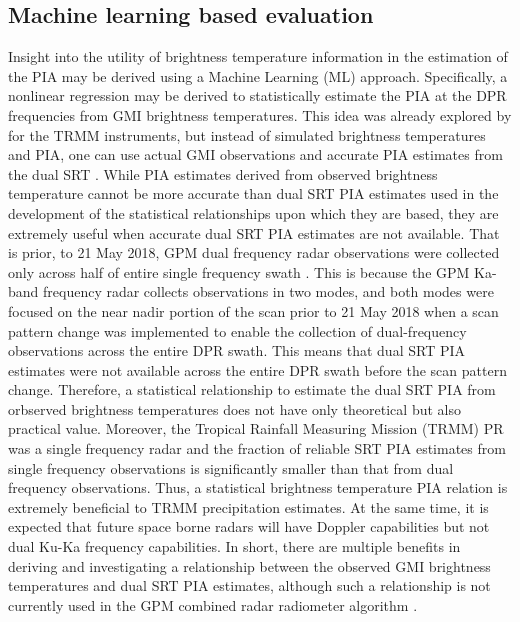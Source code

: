 \documentclass[10pt]{ietbook}
\begin{document}
\subsection{Machine learning based evaluation}
Insight into the utility of brightness temperature information in the estimation of the PIA may be derived using a Machine Learning (ML) \cite{geron2022}
approach.  Specifically, a nonlinear regression may be derived to statistically estimate the PIA at the DPR frequencies from GMI brightness temperatures.
This idea was already explored by \cite{smith1997} for the TRMM instruments, but instead of simulated brightness temperatures and PIA, 
one can use actual GMI observations and accurate PIA estimates from the dual SRT \cite{meneghini2015}.  While PIA estimates derived from observed brightness
temperature cannot be more accurate than dual SRT PIA estimates used in the development of the statistical relationships upon which they are based,
they are extremely useful when accurate dual SRT PIA estimates are not available.  That is prior, to 21 May 2018, GPM dual frequency radar observations were
collected only across half of entire single frequency swath \cite{seto2021}.  This is because the GPM Ka-band frequency radar collects observations in two modes,
and both modes were focused on the near nadir portion of the scan prior to 21 May 2018 when a scan pattern change was implemented to enable the collection of 
dual-frequency observations across the entire DPR swath. This means that dual SRT PIA estimates were not available across the entire DPR swath before the
scan pattern change.  Therefore, a statistical relationship to estimate the dual SRT PIA from orbserved brightness temperatures 
does not have only theoretical but also practical value.  Moreover, the Tropical Rainfall Measuring Mission (TRMM)  PR was a single frequency radar \cite{kummerow1998}
and the fraction  of reliable SRT PIA estimates from single frequency observations is significantly smaller than that from dual frequency observations. Thus, a statistical 
brightness temperature PIA relation is extremely beneficial to TRMM precipitation estimates.  At the same time, it is expected that future space borne radars
will have Doppler capabilities but not dual Ku-Ka frequency capabilities. In short, there are multiple benefits in deriving and investigating a relationship
between the observed GMI brightness temperatures and dual SRT PIA estimates, although such a relationship is not currently used in the GPM combined radar radiometer
algorithm \cite{grecu2016}.
\end{document}
